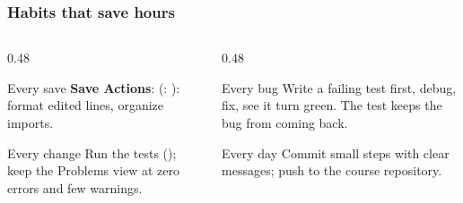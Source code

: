 \documentclass[aspectratio=169,10pt,compress]{beamer}
\begin{document}




\begin{frame}[t,fragile] \frametitle{Habits that save hours}
  \begin{columns}[T]
    \begin{column}{0.48\textwidth}
      \begin{block}{Every save}
        \small \textbf{Save Actions}:  (\mac: ):
        format edited lines, organize imports.
      \end{block}
      \begin{block}{Every change}
        \small Run the tests (); keep the Problems view at zero errors and few warnings.
      \end{block}
    \end{column}
    \begin{column}{0.48\textwidth}
      \begin{block}{Every bug}
        \small Write a failing test first, debug, fix, see it turn green. The test keeps the bug from coming back.
      \end{block}
      \begin{block}{Every day}
        \small Commit small steps with clear messages; push to the course repository.
      \end{block}
    \end{column}
  \end{columns}
\end{frame}

\end{document}

